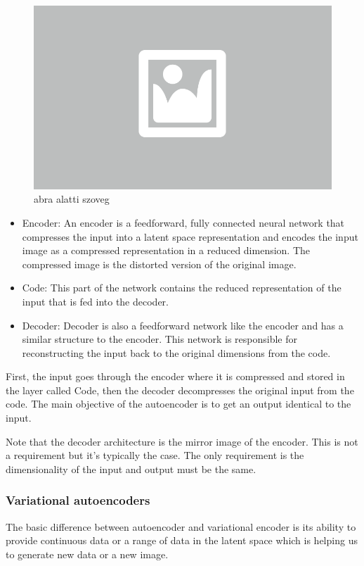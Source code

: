 \begin{figure}[h]
	\centering
	\includegraphics[width=0.65\columnwidth]{figures/abra.png}
	\caption{abra alatti szoveg}
\end{figure}

\begin{itemize}
	\item Encoder: An encoder is a feedforward, fully connected neural network that compresses the input into a latent space representation and encodes the input image as a compressed representation in a reduced dimension. The compressed image is the distorted version of the original image.
	\item Code: This part of the network contains the reduced representation of the input that is fed into the decoder.
	\item Decoder: Decoder is also a feedforward network like the encoder and has a similar structure to the encoder. This network is responsible for reconstructing the input back to the original dimensions from the code.
\end{itemize}

First, the input goes through the encoder where it is compressed and stored in the layer called Code, then the decoder decompresses the original input from the code. The main objective of the autoencoder is to get an output identical to the input.

Note that the decoder architecture is the mirror image of the encoder. This is not a requirement but it’s typically the case. The only requirement is the dimensionality of the input and output must be the same.

\subsubsection{Variational autoencoders}

The basic difference between autoencoder and variational encoder is its ability to provide continuous data or a range of data in the latent space which is helping us to generate new data or a new image.

